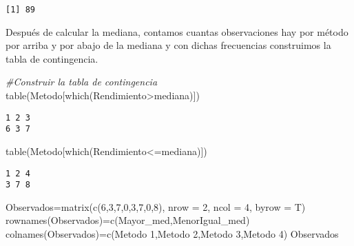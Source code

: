 \documentclass[
  a4paper,
  oneside,
  openany]{book}
\newenvironment{Shaded}{\begin{snugshade}}{\end{snugshade}}
\newcommand{\AttributeTok}[1]{\textcolor[rgb]{0.77,0.63,0.00}{#1}}
\newcommand{\CommentTok}[1]{\textcolor[rgb]{0.56,0.35,0.01}{\textit{#1}}}
\newcommand{\DecValTok}[1]{\textcolor[rgb]{0.00,0.00,0.81}{#1}}
\newcommand{\FunctionTok}[1]{\textcolor[rgb]{0.00,0.00,0.00}{#1}}
\newcommand{\NormalTok}[1]{#1}
\newcommand{\OtherTok}[1]{\textcolor[rgb]{0.56,0.35,0.01}{#1}}
\newcommand{\SpecialCharTok}[1]{\textcolor[rgb]{0.00,0.00,0.00}{#1}}
\newcommand{\StringTok}[1]{\textcolor[rgb]{0.31,0.60,0.02}{#1}}
\begin{document}
\begin{verbatim}
[1] 89
\end{verbatim}

Después de calcular la mediana, contamos cuantas observaciones hay por método por arriba y por abajo de la mediana y con dichas frecuencias construimos la tabla de contingencia.

\begin{Shaded}
\begin{Highlighting}[]
\CommentTok{\#Construir la tabla de contingencia}
\FunctionTok{table}\NormalTok{(Metodo[}\FunctionTok{which}\NormalTok{(Rendimiento}\SpecialCharTok{\textgreater{}}\NormalTok{mediana)])}
\end{Highlighting}
\end{Shaded}

\begin{verbatim}
1 2 3 
6 3 7 
\end{verbatim}

\begin{Shaded}
\begin{Highlighting}[]
\FunctionTok{table}\NormalTok{(Metodo[}\FunctionTok{which}\NormalTok{(Rendimiento}\SpecialCharTok{\textless{}=}\NormalTok{mediana)])}
\end{Highlighting}
\end{Shaded}

\begin{verbatim}
1 2 4 
3 7 8 
\end{verbatim}

\begin{Shaded}
\begin{Highlighting}[]
\NormalTok{Observados}\OtherTok{=}\FunctionTok{matrix}\NormalTok{(}\FunctionTok{c}\NormalTok{(}\DecValTok{6}\NormalTok{,}\DecValTok{3}\NormalTok{,}\DecValTok{7}\NormalTok{,}\DecValTok{0}\NormalTok{,}\DecValTok{3}\NormalTok{,}\DecValTok{7}\NormalTok{,}\DecValTok{0}\NormalTok{,}\DecValTok{8}\NormalTok{), }\AttributeTok{nrow =} \DecValTok{2}\NormalTok{, }\AttributeTok{ncol =} \DecValTok{4}\NormalTok{, }\AttributeTok{byrow =}\NormalTok{ T)}
\FunctionTok{rownames}\NormalTok{(Observados)}\OtherTok{=}\FunctionTok{c}\NormalTok{(}\StringTok{\textquotesingle{}Mayor\_med\textquotesingle{}}\NormalTok{,}\StringTok{\textquotesingle{}MenorIgual\_med\textquotesingle{}}\NormalTok{)}
\FunctionTok{colnames}\NormalTok{(Observados)}\OtherTok{=}\FunctionTok{c}\NormalTok{(}\StringTok{\textquotesingle{}Metodo 1\textquotesingle{}}\NormalTok{,}\StringTok{\textquotesingle{}Metodo 2\textquotesingle{}}\NormalTok{,}\StringTok{\textquotesingle{}Metodo 3\textquotesingle{}}\NormalTok{,}\StringTok{\textquotesingle{}Metodo 4\textquotesingle{}}\NormalTok{)}
\NormalTok{Observados}
\end{Highlighting}
\end{Shaded}
\end{document}

